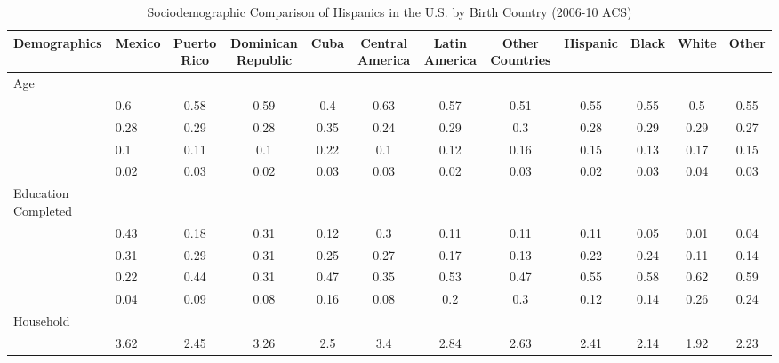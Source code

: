 \documentclass[
]{article}
\begin{document}
\begin{landscape}
\begin{table}[ht]
\centering
\caption{Sociodemographic Comparison of Hispanics in the U.S. by Birth Country (2006-10 ACS)} 
\begingroup\small
\begin{tabular}{>{\raggedright\arraybackslash}p{3.2cm}|lcccccc|cccc}
  \hline
Demographics & Mexico & Puerto Rico & Dominican Republic & Cuba & Central America & Latin America & Other Countries & Hispanic & Black & White & Other \\ 
  \hline
Age &  &  &  &  &  &  &  &  &  &  &  \\ 
  \multicolumn{1}{>{\raggedleft\arraybackslash}p{1.5cm}|}{\makebox[1.5cm][r]{60 - 69 }}& 0.6 & 0.58 & 0.59 & 0.4 & 0.63 & 0.57 & 0.51 & 0.55 & 0.55 & 0.5 & 0.55 \\ 
  \multicolumn{1}{>{\raggedleft\arraybackslash}p{1.5cm}|}{\makebox[1.5cm][r]{70 - 79 }}& 0.28 & 0.29 & 0.28 & 0.35 & 0.24 & 0.29 & 0.3 & 0.28 & 0.29 & 0.29 & 0.27 \\ 
  \multicolumn{1}{>{\raggedleft\arraybackslash}p{1.5cm}|}{\makebox[1.5cm][r]{80 - 89 }}& 0.1 & 0.11 & 0.1 & 0.22 & 0.1 & 0.12 & 0.16 & 0.15 & 0.13 & 0.17 & 0.15 \\ 
  \multicolumn{1}{>{\raggedleft\arraybackslash}p{1.5cm}|}{\makebox[1.5cm][r]{90 plus }}& 0.02 & 0.03 & 0.02 & 0.03 & 0.03 & 0.02 & 0.03 & 0.02 & 0.03 & 0.04 & 0.03 \\ 
  Education Completed &  &  &  &  &  &  &  &  &  &  &  \\ 
  \multicolumn{1}{>{\raggedleft\arraybackslash}p{3.2cm}|}{\makebox[3.2cm][r]{Less than Primary }}& 0.43 & 0.18 & 0.31 & 0.12 & 0.3 & 0.11 & 0.11 & 0.11 & 0.05 & 0.01 & 0.04 \\ 
  \multicolumn{1}{>{\raggedleft\arraybackslash}p{1.7cm}|}{\makebox[1.7cm][r]{Primary }}& 0.31 & 0.29 & 0.31 & 0.25 & 0.27 & 0.17 & 0.13 & 0.22 & 0.24 & 0.11 & 0.14 \\ 
  \multicolumn{1}{>{\raggedleft\arraybackslash}p{2cm}|}{\makebox[2cm][r]{Secondary }}& 0.22 & 0.44 & 0.31 & 0.47 & 0.35 & 0.53 & 0.47 & 0.55 & 0.58 & 0.62 & 0.59 \\ 
  \multicolumn{1}{>{\raggedleft\arraybackslash}p{2cm}|}{\makebox[2cm][r]{University }}& 0.04 & 0.09 & 0.08 & 0.16 & 0.08 & 0.2 & 0.3 & 0.12 & 0.14 & 0.26 & 0.24 \\ 
  Household &  &  &  &  &  &  &  &  &  &  &  \\ 
  \multicolumn{1}{>{\raggedleft\arraybackslash}p{2.7cm}|}{\makebox[2.7cm][r]{Household Size }}& 3.62 & 2.45 & 3.26 & 2.5 & 3.4 & 2.84 & 2.63 & 2.41 & 2.14 & 1.92 & 2.23 \\ 

\end{tabular}
\end{table}
\end{landscape}
\end{document}
